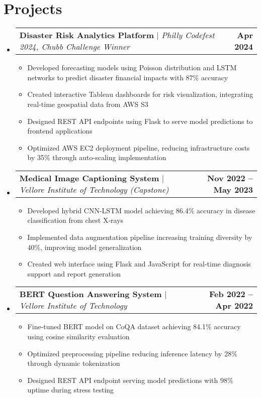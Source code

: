 \documentclass[letterpaper,11pt]{article}
\makeatletter
\newcommand{\resumeItem}[1]{
  \item\small{
    {#1 \vspace{-2pt}}
  }
}
\newcommand{\resumeProjectHeading}[2]{
    \item
    \begin{tabular*}{1.001\textwidth}{l@{\extracolsep{\fill}}r}
      \small#1 & \textbf{\small #2}\\
    \end{tabular*}\vspace{-3pt}
}
\newcommand{\resumeSubHeadingListStart}{\begin{itemize}[leftmargin=0.0in, label={}]}
\newcommand{\resumeSubHeadingListEnd}{\end{itemize}}
\newcommand{\resumeItemListStart}{\begin{itemize}}
\newcommand{\resumeItemListEnd}{\end{itemize}\vspace{-5pt}}
\makeatother
\begin{document}
\section{Projects}
\vspace{-5pt}
\resumeSubHeadingListStart
    \resumeProjectHeading
    {\textbf{Disaster Risk Analytics Platform} $|$ \emph{Philly Codefest 2024, Chubb Challenge Winner}} {Apr 2024}
    \resumeItemListStart
        \resumeItem{Developed forecasting models using Poisson distribution and LSTM networks to predict disaster financial impacts with 87\% accuracy}
        \resumeItem{Created interactive Tableau dashboards for risk visualization, integrating real-time geospatial data from AWS S3}
        \resumeItem{Designed REST API endpoints using Flask to serve model predictions to frontend applications}
        \resumeItem{Optimized AWS EC2 deployment pipeline, reducing infrastructure costs by 35\% through auto-scaling implementation}
    \resumeItemListEnd
    \vspace{-15pt}
    \resumeProjectHeading
    {\textbf{Medical Image Captioning System} $|$ \emph{Vellore Institute of Technology (Capstone)}} {Nov 2022 -- May 2023}
    \resumeItemListStart
        \resumeItem{Developed hybrid CNN-LSTM model achieving 86.4\% accuracy in disease classification from chest X-rays}
        \resumeItem{Implemented data augmentation pipeline increasing training diversity by 40\%, improving model generalization}
        \resumeItem{Created web interface using Flask and JavaScript for real-time diagnosis support and report generation}
    \resumeItemListEnd
    \resumeProjectHeading
    {\textbf{BERT Question Answering System} $|$ \emph{Vellore Institute of Technology}} {Feb 2022 -- Apr 2022}
    \resumeItemListStart
        \resumeItem{Fine-tuned BERT model on CoQA dataset achieving 84.1\% accuracy using cosine similarity evaluation}
        \resumeItem{Optimized preprocessing pipeline reducing inference latency by 28\% through dynamic tokenization}
        \resumeItem{Designed REST API endpoint serving model predictions with 98\% uptime during stress testing}
    \resumeItemListEnd
\resumeSubHeadingListEnd

\end{document}
